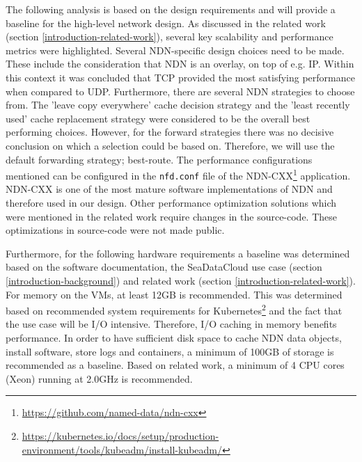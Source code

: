 The following analysis is based on the design requirements and will provide a baseline for the high-level network design. As discussed in the related work (section \ref{introduction-related-work}), several key scalability and performance metrics were highlighted. Several NDN-specific design choices need to be made. These include the consideration that NDN is an overlay, on top of e.g. IP. Within this context it was concluded that TCP provided the most satisfying performance when compared to UDP. Furthermore, there are several NDN strategies to choose from. The 'leave copy everywhere' cache decision strategy and the 'least recently used' cache replacement strategy were considered to be the overall best performing choices. However, for the forward strategies there was no decisive conclusion on which a selection could be based on. Therefore, we will use the default forwarding strategy; best-route. The performance configurations mentioned can be configured in the \texttt{nfd.conf} file of the NDN-CXX\footnote{\url{https://github.com/named-data/ndn-cxx}} application. NDN-CXX is one of the most mature software implementations of NDN and therefore used in our design. Other performance optimization solutions which were mentioned in the related work require changes in the source-code. These optimizations in source-code were not made public.

Furthermore, for the following hardware requirements a baseline was determined based on the software documentation, the SeaDataCloud use case (section \ref{introduction-background}) and related work (section \ref{introduction-related-work}). For memory on the VMs, at least 12GB is recommended. This was determined based on recommended system requirements for Kubernetes\footnote{\url{https://kubernetes.io/docs/setup/production-environment/tools/kubeadm/install-kubeadm/}} and the fact that the use case will be I/O intensive. Therefore, I/O caching in memory benefits performance. In order to have sufficient disk space to cache NDN data objects, install software, store logs and containers, a minimum of 100GB of storage is recommended as a baseline. Based on related work, a minimum of 4 CPU cores (Xeon) running at 2.0GHz is recommended.

